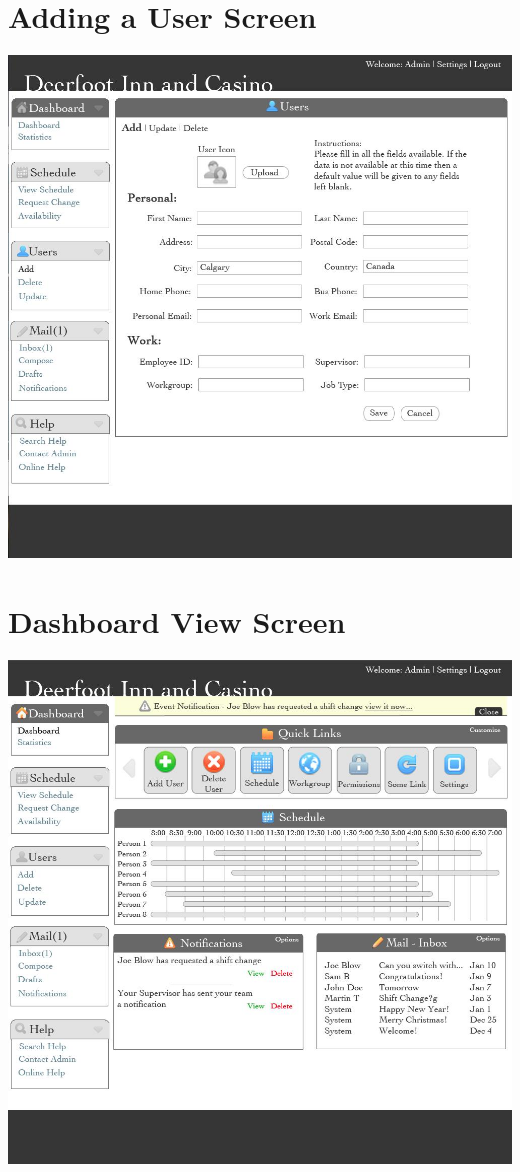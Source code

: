 \documentclass[letterpaper,12pt]{report}
\begin{document}
\begin{landscape}
\section{Adding a User Screen}
\begin{center}
 \includegraphics[scale=0.3]{prototypes/p2addUser.jpeg}
\end{center}

\section{Dashboard View Screen}
\begin{center}
 \includegraphics[scale=0.3]{prototypes/p2dashboard.jpeg}
\end{center}


\end{landscape}
\end{document}
